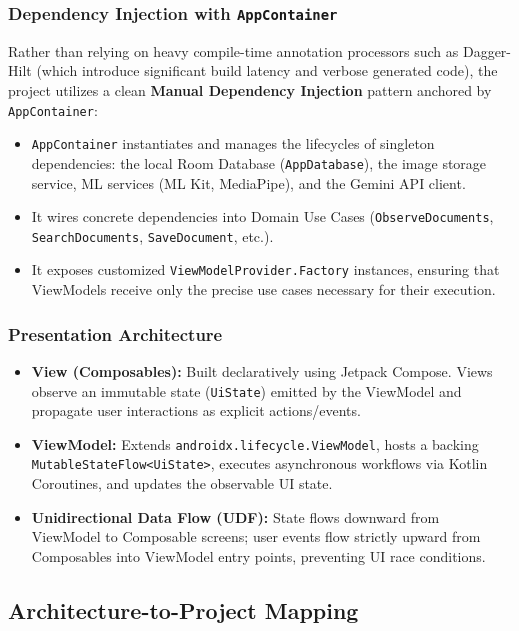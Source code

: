 \subsubsection{Dependency Injection with \texttt{AppContainer}}
Rather than relying on heavy compile-time annotation processors such as Dagger-Hilt (which introduce significant build latency and verbose generated code), the project utilizes a clean \textbf{Manual Dependency Injection} pattern anchored by \texttt{AppContainer}:
\begin{itemize}
    \item \texttt{AppContainer} instantiates and manages the lifecycles of singleton dependencies: the local Room Database (\texttt{AppDatabase}), the image storage service, ML services (ML Kit, MediaPipe), and the Gemini API client.
    \item It wires concrete dependencies into Domain Use Cases (\texttt{ObserveDocuments}, \texttt{SearchDocuments}, \texttt{SaveDocument}, etc.).
    \item It exposes customized \texttt{ViewModelProvider.Factory} instances, ensuring that ViewModels receive only the precise use cases necessary for their execution.
\end{itemize}

\subsubsection{Presentation Architecture}
\begin{itemize}
    \item \textbf{View (Composables):} Built declaratively using Jetpack Compose. Views observe an immutable state (\texttt{UiState}) emitted by the ViewModel and propagate user interactions as explicit actions/events.
    \item \textbf{ViewModel:} Extends \texttt{androidx.lifecycle.ViewModel}, hosts a backing \texttt{MutableStateFlow<UiState>}, executes asynchronous workflows via Kotlin Coroutines, and updates the observable UI state.
    \item \textbf{Unidirectional Data Flow (UDF):} State flows downward from ViewModel to Composable screens; user events flow strictly upward from Composables into ViewModel entry points, preventing UI race conditions.
\end{itemize}

\subsection{Architecture-to-Project Mapping}

